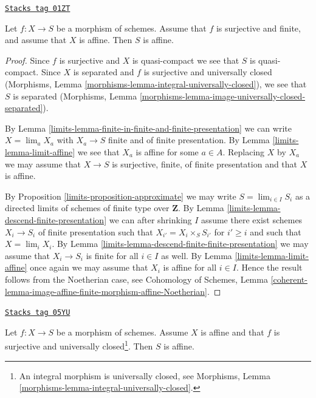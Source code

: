 \begin{lemma}
\label{limits-lemma-affine}
\href{https://stacks.math.columbia.edu/tag/01ZT}{\texttt{Stacks tag 01ZT}}


Let $f : X \to S$ be a morphism of schemes.
Assume that $f$ is surjective and finite, and assume that $X$ is affine.
Then $S$ is affine.
\end{lemma}

\begin{proof}

Since $f$ is surjective and $X$ is quasi-compact we see that $S$ is
quasi-compact. Since $X$ is separated and $f$ is surjective and
universally closed (Morphisms, Lemma
\ref{morphisms-lemma-integral-universally-closed}), we see that $S$
is separated (Morphisms, Lemma
\ref{morphisms-lemma-image-universally-closed-separated}).

\medskip\noindent
By Lemma \ref{limits-lemma-finite-in-finite-and-finite-presentation}
we can write $X = \lim_a X_a$ with $X_a \to S$ finite and of finite
presentation. By Lemma \ref{limits-lemma-limit-affine} we see that $X_a$
is affine for some $a \in A$. Replacing $X$ by $X_a$ we may assume
that $X \to S$ is surjective, finite, of finite presentation and
that $X$ is affine.

\medskip\noindent
By Proposition \ref{limits-proposition-approximate} we may write
$S = \lim_{i \in I} S_i$ as
a directed limits of schemes of finite type over $\mathbf{Z}$.
By Lemma \ref{limits-lemma-descend-finite-presentation} we can
after shrinking $I$ assume there exist schemes $X_i \to S_i$
of finite presentation such that $X_{i'} = X_i \times_S S_{i'}$
for $i' \geq i$ and such that $X = \lim_i X_i$. By
Lemma \ref{limits-lemma-descend-finite-finite-presentation} we may
assume that $X_i \to S_i$ is finite for all $i \in I$ as well.
By Lemma \ref{limits-lemma-limit-affine} once again we may assume that $X_i$ is
affine for all $i \in I$. Hence the result follows from the
Noetherian case, see Cohomology of Schemes,
Lemma \ref{coherent-lemma-image-affine-finite-morphism-affine-Noetherian}.
\end{proof}

\begin{proposition}
\label{limits-proposition-affine}
\href{https://stacks.math.columbia.edu/tag/05YU}{\texttt{Stacks tag 05YU}}


Let $f : X \to S$ be a morphism of schemes. Assume $X$ is affine
and that $f$ is surjective and universally closed\footnote{An integral
morphism is universally closed, see
Morphisms, Lemma \ref{morphisms-lemma-integral-universally-closed}.}.
Then $S$ is affine.
\end{proposition}

